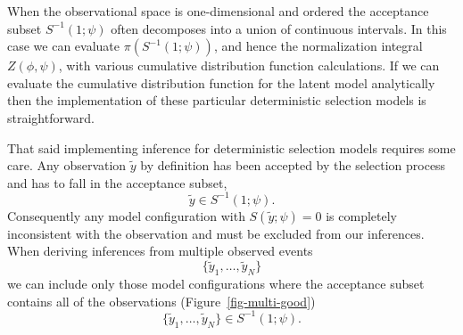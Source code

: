 \documentclass[
  letterpaper,
  DIV=11,
  numbers=noendperiod]{scrartcl}
\begin{document}
When the observational space is one-dimensional and ordered the
acceptance subset \(S^{-1}(1; \psi)\) often decomposes into a union of
continuous intervals. In this case we can evaluate
\(\pi ( S^{-1}(1; \psi) )\), and hence the normalization integral
\(Z(\phi, \psi)\), with various cumulative distribution function
calculations. If we can evaluate the cumulative distribution function
for the latent model analytically then the implementation of these
particular deterministic selection models is straightforward.

That said implementing inference for deterministic selection models
requires some care. Any observation \(\tilde{y}\) by definition has been
accepted by the selection process and has to fall in the acceptance
subset, \[
\tilde{y} \in S^{-1}(1; \psi).
\] Consequently any model configuration with \(S(\tilde{y}; \psi) = 0\)
is completely inconsistent with the observation and must be excluded
from our inferences. When deriving inferences from multiple observed
events \[
\{ \tilde{y}_{1}, \ldots, \tilde{y}_{N} \}
\] we can include only those model configurations where the acceptance
subset contains all of the observations (Figure~\ref{fig-multi-good}) \[
\{ \tilde{y}_{1}, \ldots, \tilde{y}_{N} \} \in S^{-1}(1; \psi).
\]
\end{document}
